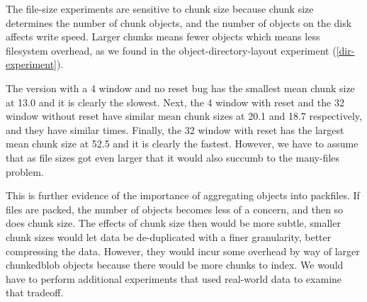 The file-size experiments are sensitive to chunk size because chunk size
determines the number of chunk objects, and the number of objects on the disk
affects write speed. Larger chunks means fewer objects which means less
filesystem overhead, as we found in the object-directory-layout experiment
(\autoref{dir-experiment}).

The version with a \SI{4}{\kib} window and no reset bug has the smallest mean
chunk size at \SI{13.0}{\kib} and it is clearly the slowest. Next, the
\SI{4}{\kib} window with reset and the \SI{32}{\kib} window without reset have
similar mean chunk sizes at \SI{20.1}{\kib} and \SI{18.7}{\kib} respectively,
and they have similar times. Finally, the \SI{32}{\kib} window with reset has
the largest mean chunk size at \SI{52.5}{\kib} and it is clearly the fastest.
However, we have to assume that as file sizes got even larger that it would also
succumb to the many-files problem.

This is further evidence of the importance of aggregating objects into
\glspl{packfile}. If files are packed, the number of objects becomes less of a
concern, and then so does chunk size. The effects of chunk size then would be
more subtle, smaller chunk sizes would let data be de-duplicated with a finer
granularity, better compressing the data. However, they would incur some
overhead by way of larger \gls{chunkedblob} objects because there would be more
chunks to index. We would have to perform additional experiments that used
real-world data to examine that tradeoff.

%
